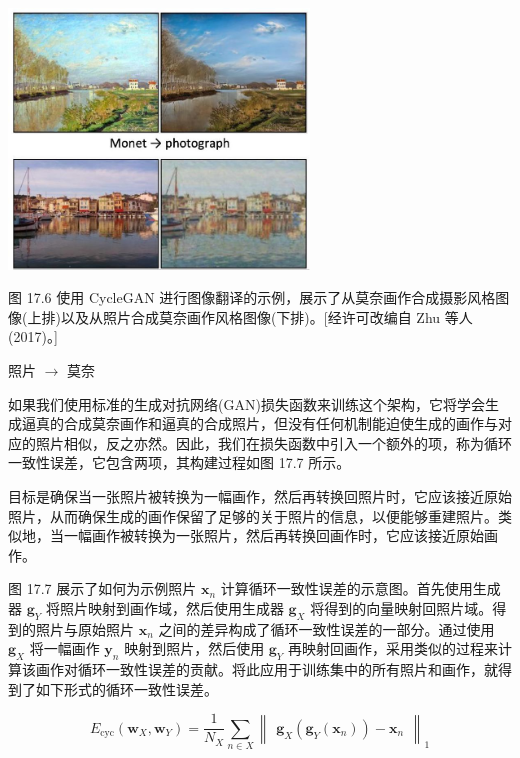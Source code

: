 \documentclass[10pt]{article}
\begin{document}
\begin{center}
\includegraphics[max width=0.6\textwidth]{images/0194e279-9b28-703a-88f4-c3ac21e2010d_560_804_348_741_641_0.jpg}
\end{center}
\hspace*{3em} 

图 17.6 使用 CycleGAN 进行图像翻译的示例，展示了从莫奈画作合成摄影风格图像(上排)以及从照片合成莫奈画作风格图像(下排)。[经许可改编自 Zhu 等人(2017)。]

照片 \(\rightarrow\) 莫奈

如果我们使用标准的生成对抗网络(GAN)损失函数来训练这个架构，它将学会生成逼真的合成莫奈画作和逼真的合成照片，但没有任何机制能迫使生成的画作与对应的照片相似，反之亦然。因此，我们在损失函数中引入一个额外的项，称为循环一致性误差，它包含两项，其构建过程如图 17.7 所示。

目标是确保当一张照片被转换为一幅画作，然后再转换回照片时，它应该接近原始照片，从而确保生成的画作保留了足够的关于照片的信息，以便能够重建照片。类似地，当一幅画作被转换为一张照片，然后再转换回画作时，它应该接近原始画作。

图 17.7 展示了如何为示例照片 \({\mathbf{x}}_{n}\) 计算循环一致性误差的示意图。首先使用生成器 \({\mathbf{g}}_{Y}\) 将照片映射到画作域，然后使用生成器 \({\mathbf{g}}_{X}\) 将得到的向量映射回照片域。得到的照片与原始照片 \({\mathbf{x}}_{n}\) 之间的差异构成了循环一致性误差的一部分。通过使用 \({\mathbf{g}}_{X}\) 将一幅画作 \({\mathbf{y}}_{n}\) 映射到照片，然后使用 \({\mathbf{g}}_{Y}\) 再映射回画作，采用类似的过程来计算该画作对循环一致性误差的贡献。将此应用于训练集中的所有照片和画作，就得到了如下形式的循环一致性误差。

\[
{E}_{\mathrm{{cyc}}}\left( {{\mathbf{w}}_{X},{\mathbf{w}}_{Y}}\right)  = \frac{1}{{N}_{X}}\mathop{\sum }\limits_{{n \in  X}}{\begin{Vmatrix}{\mathbf{g}}_{X}\left( {\mathbf{g}}_{Y}\left( {\mathbf{x}}_{n}\right) \right)  - {\mathbf{x}}_{n}\end{Vmatrix}}_{1}
\]
\end{document}
